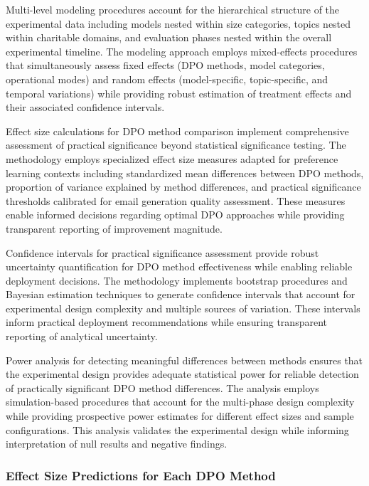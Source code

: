 Multi-level modeling procedures account for the hierarchical structure of the experimental data including models nested within size categories, topics nested within charitable domains, and evaluation phases nested within the overall experimental timeline. The modeling approach employs mixed-effects procedures that simultaneously assess fixed effects (DPO methods, model categories, operational modes) and random effects (model-specific, topic-specific, and temporal variations) while providing robust estimation of treatment effects and their associated confidence intervals.

Effect size calculations for DPO method comparison implement comprehensive assessment of practical significance beyond statistical significance testing. The methodology employs specialized effect size measures adapted for preference learning contexts including standardized mean differences between DPO methods, proportion of variance explained by method differences, and practical significance thresholds calibrated for email generation quality assessment. These measures enable informed decisions regarding optimal DPO approaches while providing transparent reporting of improvement magnitude.

Confidence intervals for practical significance assessment provide robust uncertainty quantification for DPO method effectiveness while enabling reliable deployment decisions. The methodology implements bootstrap procedures and Bayesian estimation techniques to generate confidence intervals that account for experimental design complexity and multiple sources of variation. These intervals inform practical deployment recommendations while ensuring transparent reporting of analytical uncertainty.

Power analysis for detecting meaningful differences between methods ensures that the experimental design provides adequate statistical power for reliable detection of practically significant DPO method differences. The analysis employs simulation-based procedures that account for the multi-phase design complexity while providing prospective power estimates for different effect sizes and sample configurations. This analysis validates the experimental design while informing interpretation of null results and negative findings.

\subsubsection{Effect Size Predictions for Each DPO Method}

